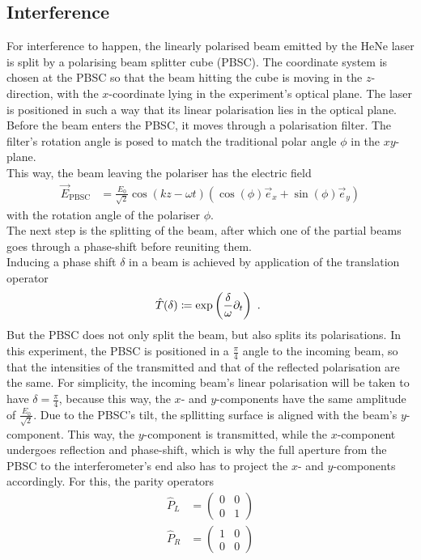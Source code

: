 \subsection{Interference}
\label{sec:Interference}
For interference to happen, the linearly polarised beam emitted by the HeNe laser is split by a polarising beam splitter cube (PBSC). The coordinate system is chosen at the PBSC so that the beam hitting the cube is moving in the $z$-direction, with the $x$-coordinate lying in the experiment's optical plane. The laser is positioned in such a way that its linear polarisation lies in the optical plane.\\
Before the beam enters the PBSC, it moves through a polarisation filter. The filter's rotation angle is posed to match the traditional polar angle $\phi$ in the $x y$-plane.\\
This way, the beam leaving the polariser has the electric field
\begin{align}
  \label{eq:E_pbsc}
  \vec{E}_\text{PBSC} &= \frac{E_0}{\sqrt{2}} \cos\left(kz - \omega t\right) \left( \cos(\phi)\vec{e}_x + \sin(\phi) \vec{e}_y \right)
\end{align}
with the rotation angle of the polariser $\phi$.\\
The next step is the splitting of the beam, after which one of the partial beams goes through a phase-shift before reuniting them.\\
Inducing a phase shift $\delta$ in a beam is achieved by application of the translation operator 
\begin{align}
  \hat T(\delta) \coloneqq \exp\left(\frac{\delta}{\omega} \partial_t\right) \text{ . }
\end{align}
But the PBSC does not only split the beam, but also splits its polarisations. In this experiment, the PBSC is positioned in a $\frac{\pi}{4}$ angle to the incoming beam, so that the intensities of the transmitted and that of the reflected polarisation are the same. For simplicity, the incoming beam's linear polarisation will be taken to have $\delta = \frac{\pi}{4}$, because this way, the $x$- and $y$-components have the same amplitude of $\frac{E_0}{\sqrt{2}}$. Due to the PBSC's tilt, the spllitting surface is aligned with the beam's $y$-component. This way, the $y$-component is transmitted, while the $x$-component undergoes reflection and phase-shift, which is why the full aperture from the PBSC to the interferometer's end also has to project the $x$- and $y$-components accordingly. For this, the parity operators 
\begin{align}
  \hat{P}_L &=
  \begin{pmatrix}
      0 & 0 \\
      0 & 1 
  \end{pmatrix} \\
  \hat{P}_R &=
  \begin{pmatrix}
      1 & 0 \\
      0 & 0 
  \end{pmatrix}
\end{align}
